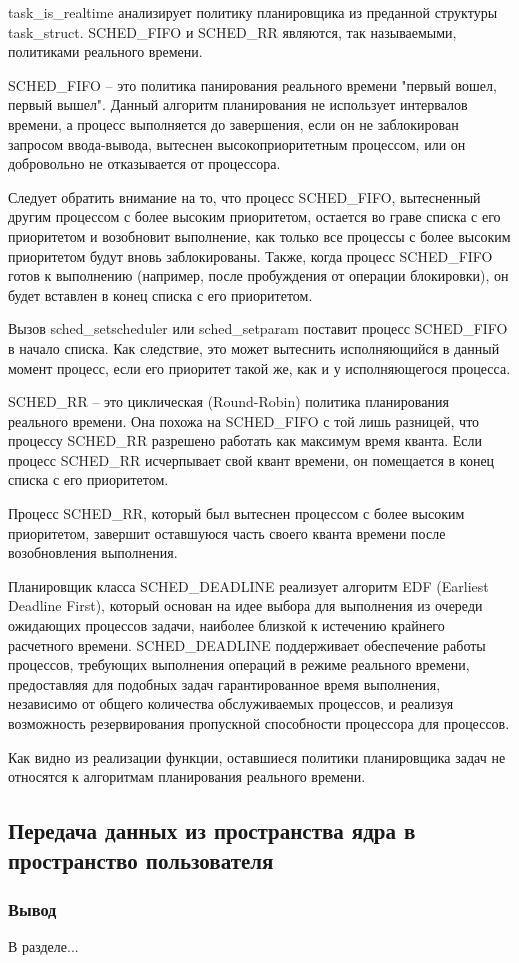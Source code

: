task\_is\_realtime анализирует политику планировщика из преданной структуры task\_struct. SCHED\_FIFO и SCHED\_RR являются, так называемыми, политиками реального времени. 

SCHED\_FIFO -- это политика панирования реального времени "первый  вошел, первый вышел".   Данный алгоритм планирования не использует интервалов времени, а процесс выполняется до завершения, если он не заблокирован запросом ввода-вывода, вытеснен высокоприоритетным процессом, или он добровольно не отказывается от процессора. \cite{scheduling}

Следует обратить внимание на то, что процесс SCHED\_FIFO, вытесненный другим процессом с более высоким приоритетом, остается во граве списка с его приоритетом и возобновит выполнение, как только все процессы с более высоким приоритетом будут вновь заблокированы. Также, когда процесс SCHED\_FIFO готов к выполнению (например, после пробуждения от операции блокировки), он будет вставлен в конец списка с его приоритетом. \cite{scheduling}

Вызов sched\_setscheduler или sched\_setparam поставит процесс SCHED\_FIFO в начало списка. Как следствие, это может вытеснить исполняющийся в данный момент процесс, если его приоритет такой же, как и у исполняющегося процесса. \cite{scheduling}

SCHED\_RR -- это циклическая (Round-Robin) политика планирования реального времени. Она похожа на SCHED\_FIFO с той лишь разницей, что процессу SCHED\_RR разрешено работать как максимум время кванта. Если процесс SCHED\_RR исчерпывает свой квант времени, он помещается в конец списка с его приоритетом. \cite{scheduling}

Процесс SCHED\_RR, который был вытеснен процессом с более высоким приоритетом, завершит оставшуюся часть своего кванта времени после возобновления выполнения. \cite{scheduling}

Планировщик класса SCHED\_DEADLINE реализует алгоритм EDF (Earliest Deadline First), который основан на идее выбора для выполнения из очереди ожидающих процессов задачи, наиболее близкой к истечению крайнего расчетного времени. SCHED\_DEADLINE поддерживает обеспечение работы процессов, требующих выполнения операций в режиме реального времени, предоставляя для подобных задач гарантированное время выполнения, независимо от общего количества обслуживаемых процессов, и реализуя возможность резервирования пропускной способности процессора для процессов. \cite{sched_deadline}

Как видно из реализации функции, оставшиеся политики планировщика задач не относятся к алгоритмам планирования реального времени.

\subsection{Передача данных из пространства ядра в пространство пользователя}

\subsubsection*{Вывод}
В разделе...

\pagebreak